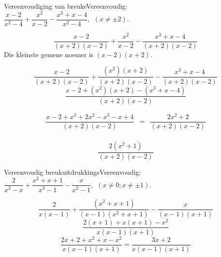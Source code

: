 %      
\begin{wex}{Vereenvoudiging van breuke}{Vereenvoudig: $\dfrac{x-2}{{x}^{2}-4}+\dfrac{{x}^{2}}{x-2}-\dfrac{{x}^{3}+x-4}{{x}^{2}-4}, ~~(x \neq \pm2)$.}
{
\begin{equation*}
\frac{x-2}{(x+2)(x-2)}+\frac{{x}^{2}}{x-2}-\frac{{x}^{3}+x-4}{(x+2)(x-2)}
\end{equation*}
 Die kleinste gemene noemer is $(x-2)(x+2)$.\par 

\begin{equation*}
\frac{x-2}{(x+2)(x-2)}+\frac{({x}^{2})
(x+2)}{(x+2)(x-2)}-\frac{{x}^{3}+x-4}{(x+2)(x-2)}
\end{equation*}
\begin{equation*}
\frac{x-2+({x}^{2})(x+2)-(x^{3}+x-4)}{(x+2)(x-2)}
\end{equation*}

\begin{equation*}
 \begin{array}{llll}
\dfrac{x-2+{x}^{3}+ 2x^{2}-x^{3} - x+4}{(x+2)(x-2)} & = & \dfrac{2x^{2} + 2}{(x+2)(x-2)}\\
\end{array}
\end{equation*}

\begin{equation*}
\dfrac{2({x}^{2}
+1)}{(x+2)(x-2)}
\end{equation*}
}
\end{wex}

\begin{wex}{Vereenvoudig breukuitdrukkings}{Vereenvoudig: $\dfrac{2}{{x}^{2}-x}+\dfrac{x^{2}+x+1}{x^{3}-1}-\dfrac{x}{{x}^{2}-1}, ~~(x \neq 0;x \neq \pm1)$.}
{
\begin{equation*}
\dfrac{2}{x(x-1)}+ \dfrac{({x}^{2} + x + 1)}{(x-1)(x^{2}+x+1)}-\dfrac{x}{(x-1)(x+1)}
\end{equation*}
\begin{equation*}
\dfrac{2(x+1)+x(x+1)-x^{2}}{x(x-1)(x+1)}
\end{equation*}
\begin{equation*}
\dfrac{2x+2 + x^{2} + x - x^{2}}{x(x-1)(x+1)} = \dfrac{3x+2}{x(x-1)(x+1)}
\end{equation*}



}
\end{wex}


